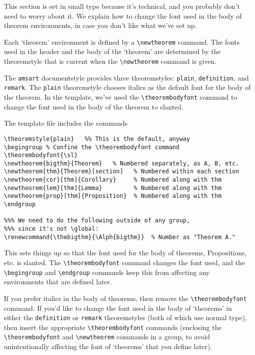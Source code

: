 This section is set in small type because it's technical,
and you probably don't need to worry about it.  We explain how
to change the font used in the body of theorem environments, in case
you don't like what we've set up.

\begin{technical}
Each `theorem' environment is defined by a \verb"\newtheorem"
command.  The fonts used in the header and the body of the
`theorem' are determined by the theoremstyle that is
current when the \verb"\newtheorem" command is given.

The \verb"amsart" documentstyle provides three theoremstyles:
\verb"plain", \verb"definition", and \verb"remark".  The \verb"plain"
theoremstyle chooses italics as the default font for the body of the
theorem.  In the template, we've used the \verb"\theorembodyfont"
command to change the font used in the body of the theorem to
slanted.

The template file includes the commands
%
\begin{verbatim}
\theoremstyle{plain}   %% This is the default, anyway
\begingroup % Confine the \theorembodyfont command
\theorembodyfont{\sl}
\newtheorem{bigthm}{Theorem}   % Numbered separately, as A, B, etc.
\newtheorem{thm}{Theorem}[section]   % Numbered within each section
\newtheorem{cor}[thm]{Corollary}     % Numbered along with thm
\newtheorem{lem}[thm]{Lemma}         % Numbered along with thm
\newtheorem{prop}[thm]{Proposition}  % Numbered along with thm
\endgroup

%%% We need to do the following outside of any group,
%%% since it's not \global:
\renewcommand{\thebigthm}{\Alph{bigthm}}  % Number as "Theorem A."
\end{verbatim}
%
This sets things up so that the font used for the body of theorems,
Propositions, etc.{} is slanted.  The \verb"\theorembodyfont" command
changes the font used, and the \verb"\begingroup" and
\verb"\endgroup" commands keep this from affecting any environments
that are defined later.

If you prefer italics in the body of theorems, then remove the
\verb"\theorembodyfont" command.  If you'd like to change the font
used in the body of `theorems' in either the \verb"definition" or
\verb"remark" theoremstyles (both of which use normal type), then
insert the appropriate \verb"\theorembodyfont" commands (enclosing the
\verb"\theorembodyfont" and \verb"\newtheorem" commands in a group,
to avoid unintentionally affecting the font of `theorems' that you
define later).

\end{technical}





